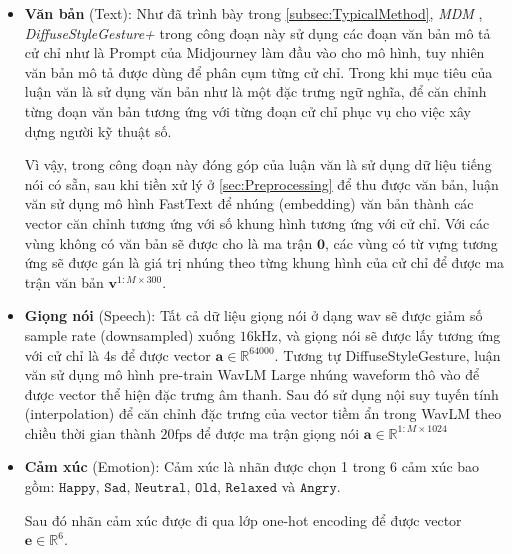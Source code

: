 \begin{itemize}
	\item \textbf{Văn bản} (Text):
		Như đã trình bày trong \autoref{subsec:TypicalMethod}, \textit{MDM} \cite{tevet2022human}, \textit{DiffuseStyleGesture+} \cite{yang2022DiffuseStyleGestureplus} trong công đoạn này sử dụng các đoạn văn bản mô tả cử chỉ như là Prompt của Midjourney làm đầu vào cho mô hình, tuy nhiên văn bản mô tả được dùng để phân cụm từng cử chỉ. Trong khi mục tiêu của luận văn là sử dụng văn bản như là một đặc trưng ngữ nghĩa, để căn chỉnh từng đoạn văn bản tương ứng với  từng đoạn cử chỉ phục vụ cho việc xây dựng người kỹ thuật số.
		
		Vì vậy, trong công đoạn này đóng góp của luận văn là sử dụng dữ liệu tiếng nói có sẵn, sau khi tiền xử lý ở \autoref{sec:Preprocessing} để thu được văn bản,  luận văn sử dụng mô hình FastText  \cite{bojanowski2017enriching} để nhúng (embedding) văn bản thành các vector căn chỉnh tương ứng với số khung hình tương ứng với cử chỉ. Với các vùng không có văn bản sẽ được cho là ma trận $\mathbf{0}$, các vùng có từ vựng tương ứng sẽ được gán là giá trị nhúng  theo từng khung hình của cử chỉ để được ma trận văn bản $\mathbf{v}^{1:M \times 300}$.
		
		\item \textbf{Giọng nói} (Speech): Tất cả dữ liệu giọng nói ở dạng wav sẽ được giảm số sample rate (downsampled) xuống $16 \mathrm{kHz}$, và giọng nói sẽ được lấy tương ứng với cử chỉ là 4s để được vector $\mathbf{a} \in \mathbb{R}^{64000}$. Tương tự DiffuseStyleGesture, luận văn sử dụng mô hình pre-train WavLM Large \cite{Chen_2022} nhúng waveform thô vào để được vector thể hiện đặc trưng âm thanh. Sau đó sử dụng nội suy tuyến tính (interpolation) để căn chỉnh đặc trưng của vector tiềm ẩn trong WavLM theo chiều thời gian thành $20 \text{fps}$ để được ma trận giọng nói $\mathbf{a} \in \mathbb{R}^{1:M \times 1024}$
		
		\item \textbf{Cảm xúc} (Emotion): Cảm xúc là nhãn được chọn 1 trong 6 cảm xúc bao gồm: $\texttt{Happy}$, $\texttt{Sad}$, $\texttt{Neutral}$, $\texttt{Old}$, $\texttt{Relaxed}$ và $\texttt{Angry}$. 
		
		Sau đó nhãn cảm xúc được đi qua lớp one-hot encoding để được vector  $\mathbf{e} \in \mathbb{R}^{6}$.
		
		
		

\end{itemize}
